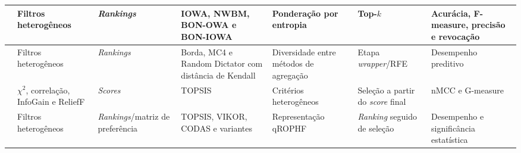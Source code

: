 \begin{table}
\begin{tabular}{|P{2.3cm}|P{2.6cm}|P{2.3cm}|P{2.8cm}|P{3.0cm}|P{3.0cm}|P{2.6cm}|}
 & Filtros heterogêneos & \textit{Rankings} & IOWA, NWBM, BON-OWA e BON-IOWA & Ponderação por entropia & Top-$k$ & Acurácia, F-measure, precisão e revocação \\ \hline
{} & Filtros heterogêneos & \textit{Rankings} & Borda, MC4 e Random Dictator com distância de Kendall & Diversidade entre métodos de agregação & Etapa \textit{wrapper}/RFE & Desempenho preditivo \\ \hline
{} & $\chi^2$, correlação, InfoGain e ReliefF & \textit{Scores} & TOPSIS & Critérios heterogêneos & Seleção a partir do \textit{score} final & nMCC e G-measure \\ \hline
{} & Filtros heterogêneos & \textit{Rankings}\slash matriz de preferência & TOPSIS, VIKOR, CODAS e variantes & Representação qROPHF & \textit{Ranking} seguido de seleção & Desempenho e significância estatística \\ \hline
\end{tabular}
\end{table}

